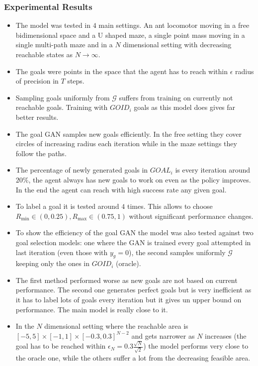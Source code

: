 \documentclass{beamer}
\theoremstyle{plain}
\theoremstyle{definition}
\theoremstyle{remark}
\begin{document}
\begin{frame}
	\frametitle{Experimental Results}
	\begin{itemize}
		\item The model was tested in $4$ main settings. An ant locomotor moving in a free bidimensional space and a U shaped maze, a single point mass moving in a single multi-path maze and in a $N$ dimensional setting with decreasing reachable states as $N\rightarrow\infty$.
		\item The goals were points in the space that the agent has to reach within $\epsilon$ radius of precision in $T$ steps.
		\item Sampling goals uniformly from $\mathcal{G}$ suffers from training on currently not reachable goals. Training with $GOID_i$ goals as this model does gives far better results.
		\item The goal GAN samples new goals efficiently. In the free setting they cover circles of increasing radius each iteration while in the maze settings they follow the paths.
		\item The percentage of newly generated goals in $GOAL_i$ is every iteration around $20\%$, the agent always has new goals to work on even as the policy improves. In the end the agent can reach with high success rate any given goal.
	\end{itemize}
\end{frame}

\begin{frame}
	\begin{itemize}
		\item To label a goal it is tested around $4$ times. This allows to choose $R_{\text{min}}\in(0,0.25), R_{\text{max}}\in(0.75,1)$ without significant performance changes.
		\item To show the efficiency of the goal GAN the model was also tested against two goal selection models: one where the GAN is trained every goal attempted in last iteration (even those with $y_g=0$), the second samples uniformly $\mathcal{G}$ keeping only the ones in $GOID_i$ (oracle).
		\item The first method performed worse as new goals are not based on current performance. The second one generates perfect goals but is very inefficient as it has to label lots of goals every iteration but it gives un upper bound on performance. The main model is really close to it.
		\item In the $N$ dimensional setting where the reachable area is $[-5,5]\times [-1,1]\times [-0.3,0.3]^{N-2}$ and gets narrower as $N$ increases (the goal has to be reached within $\epsilon_N=0.3\frac{\sqrt{N}}{\sqrt{2}}$) the model performs very close to the oracle one, while the others suffer a lot from the decreasing feasible area.
	\end{itemize}
\end{frame}
\end{document}
